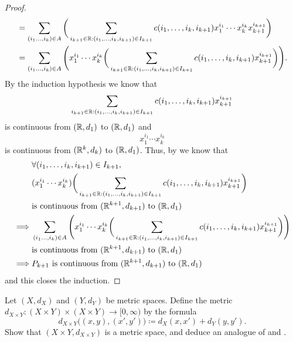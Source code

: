 \begin{proof}
\begin{align*}
     & = \sum_{(i_1 \dots, i_k) \in A} \bigg(\sum_{i_{k + 1} \in \mathbb{R} : (i_1, \dots, i_k, i_{k + 1}) \in I_{k + 1}} c(i_1, \dots, i_k, i_{k + 1}) x_1^{i_1} \cdots x_k^{i_k} x_{k + 1}^{i_{k + 1}}\bigg)              \\
     & = \sum_{(i_1 \dots, i_k) \in A} \Bigg(x_1^{i_1} \cdots x_k^{i_k} \bigg(\sum_{i_{k + 1} \in \mathbb{R} : (i_1, \dots, i_k, i_{k + 1}) \in I_{k + 1}} c(i_1, \dots, i_k, i_{k + 1}) x_{k + 1}^{i_{k + 1}}\bigg)\Bigg).
  \end{align*}
  By the induction hypothesis we know that
  \[
    \sum_{i_{k + 1} \in \mathbb{R} : (i_1, \dots, i_k, i_{k + 1}) \in I_{k + 1}} c(i_1, \dots, i_k, i_{k + 1}) x_{k + 1}^{i_{k + 1}}
  \]
  is continuous from \((\mathbb{R}, d_1)\) to \((\mathbb{R}, d_1)\) and
  \[
    x_1^{i_1} \cdots x_k^{i_k}
  \]
  is continuous from \((\mathbb{R}^k, d_k)\) to \((\mathbb{R}, d_1)\).
  Thus, by  we know that
  \begin{align*}
             & \forall (i_1, \dots, i_k, i_{k + 1}) \in I_{k + 1},                                                                                                                                                       \\
             & (x_1^{i_1} \cdots x_k^{i_k}) \bigg(\sum_{i_{k + 1} \in \mathbb{R} : (i_1, \dots, i_k, i_{k + 1}) \in I_{k + 1}} c(i_1, \dots, i_k, i_{k + 1}) x_{k + 1}^{i_{k + 1}}\bigg)                                         \\
             & \text{is continuous from } (\mathbb{R}^{k + 1}, d_{k + 1}) \text{ to } (\mathbb{R}, d_1)                                                                                                                                  \\
    \implies & \sum_{(i_1 \dots, i_k) \in A} \Bigg(x_1^{i_1} \cdots x_k^{i_k} \bigg(\sum_{i_{k + 1} \in \mathbb{R} : (i_1, \dots, i_k, i_{k + 1}) \in I_{k + 1}} c(i_1, \dots, i_k, i_{k + 1}) x_{k + 1}^{i_{k + 1}}\bigg)\Bigg) \\
             & \text{is continuous from } (\mathbb{R}^{k + 1}, d_{k + 1}) \text{ to } (\mathbb{R}, d_1)                                                                                                                                  \\
    \implies & P_{k + 1} \text{ is continuous from } (\mathbb{R}^{k + 1}, d_{k + 1}) \text{ to } (\mathbb{R}, d_1)
  \end{align*}
  and this closes the induction.
\end{proof}

\begin{ex}\label{ii:ex:2.2.8}
  Let \((X, d_X)\) and \((Y, d_Y)\) be metric spaces.
  Define the metric \(d_{X \times Y} : (X \times Y) \times (X \times Y) \to [0, \infty)\) by the formula
  \[
    d_{X \times Y}\big((x, y), (x', y')\big) \coloneqq d_X(x, x') + d_Y(y, y').
  \]
  Show that \((X \times Y, d_{X \times Y})\) is a metric space, and deduce an analogue of  and .
\end{ex}

